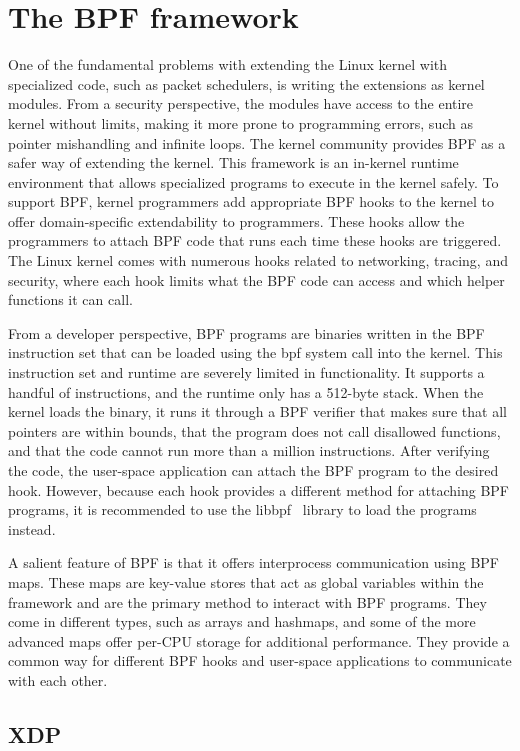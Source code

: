 \documentclass[sigconf, nonacm]{acmart}
\begin{document}
\section{The BPF framework}

One of the fundamental problems with extending the Linux kernel with specialized code, such as packet schedulers, is writing the extensions as kernel modules. From a security perspective, the modules have access to the entire kernel without limits, making it more prone to programming errors, such as pointer mishandling and infinite loops. The kernel community provides BPF as a safer way of extending the kernel. This framework is an in-kernel runtime environment that allows specialized programs to execute in the kernel safely. To support BPF, kernel programmers add appropriate BPF hooks to the kernel to offer domain-specific extendability to programmers. These hooks allow the programmers to attach BPF code that runs each time these hooks are triggered. The Linux kernel comes with numerous hooks related to networking, tracing, and security, where each hook limits what the BPF code can access and which helper functions it can call.

From a developer perspective, BPF programs are binaries written in the BPF instruction set that can be loaded using the bpf system call into the kernel. This instruction set and runtime are severely limited in functionality. It supports a handful of instructions, and the runtime only has a 512-byte stack. When the kernel loads the binary, it runs it through a BPF verifier that makes sure that all pointers are within bounds, that the program does not call disallowed functions, and that the code cannot run more than a million instructions. After verifying the code, the user-space application can attach the BPF program to the desired hook. However, because each hook provides a different method for attaching BPF programs, it is recommended to use the libbpf~\cite{libbpf} library to load the programs instead.

A salient feature of BPF is that it offers interprocess communication using BPF maps. These maps are key-value stores that act as global variables within the framework and are the primary method to interact with BPF programs. They come in different types, such as arrays and hashmaps, and some of the more advanced maps offer per-CPU storage for additional performance. They provide a common way for different BPF hooks and user-space applications to communicate with each other.


\subsection{XDP} \label{sec:xdp}
\end{document}
